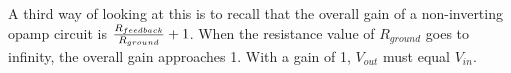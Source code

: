 \vskip 10pt

A third way of looking at this is to recall that the overall gain of a non-inverting opamp circuit is ${R_{feedback} \over R_{ground}} + 1$.  When the resistance value of $R_{ground}$ goes to infinity, the overall gain approaches 1.  With a gain of 1, $V_{out}$ must equal $V_{in}$.




